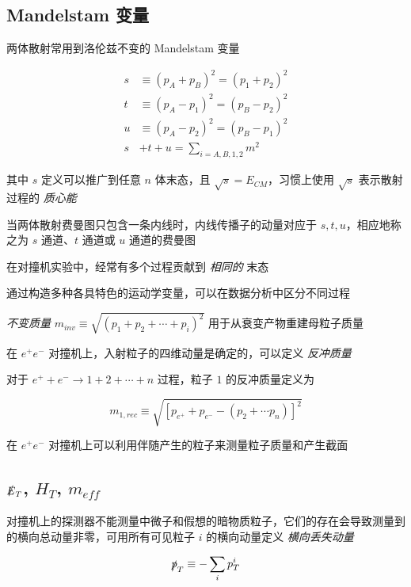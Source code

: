 \subsection{Mandelstam 变量}

两体散射常用到洛伦兹不变的 Mandelstam 变量

\begin{align}
    s &\equiv (p_A + p_B)^2 = (p_1 + p_2)^2 \\
    t &\equiv (p_A - p_1)^2 = (p_B - p_2)^2 \\
    u &\equiv (p_A - p_2)^2 = (p_B - p_1)^2 \\
    s &+t+u = \sum_{i=A,B,1,2} m^2
\end{align}

其中 $s$ 定义可以推广到任意 $n$ 体末态，且 $\sqrt{s}=E_{CM}$，习惯上使用 $\sqrt{s}$ 表示散射过程的 \emph{质心能}

当两体散射费曼图只包含一条内线时，内线传播子的动量对应于 $s, t, u$，相应地称之为 $s$ 通道、$t$ 通道或 $u$ 通道的费曼图

在对撞机实验中，经常有多个过程贡献到 \emph{相同的} 末态

通过构造多种各具特色的运动学变量，可以在数据分析中区分不同过程

\emph{不变质量} $m_{inv} \equiv \sqrt{(p_1 + p_2 + \cdots + p_i)^2}$ 用于从衰变产物重建母粒子质量

在 $e^+ e^-$ 对撞机上，入射粒子的四维动量是确定的，可以定义 \emph{反冲质量}

对于 $e^+ + e^- \to 1 + 2 + \cdots + n$ 过程，粒子 $1$ 的反冲质量定义为

\begin{equation}
    m_{1, rec} \equiv \sqrt{[p_{e^+} + p_{e^-} - (p_2 + \cdots p_n)]^2}
\end{equation}

在 $e^+ e^-$ 对撞机上可以利用伴随产生的粒子来测量粒子质量和产生截面

\subsection{\texorpdfstring{$\slashed{E}_T$}{ET}, \texorpdfstring{$H_T$}{HT}, \texorpdfstring{$m_{eff}$}{meff}}

对撞机上的探测器不能测量中微子和假想的暗物质粒子，它们的存在会导致测量到的横向总动量非零，可用所有可见粒子 $i$ 的横向动量定义 \emph{横向丢失动量}

\begin{equation}
    \slashed{p}_T \equiv -\sum_i p^i_T
\end{equation}

